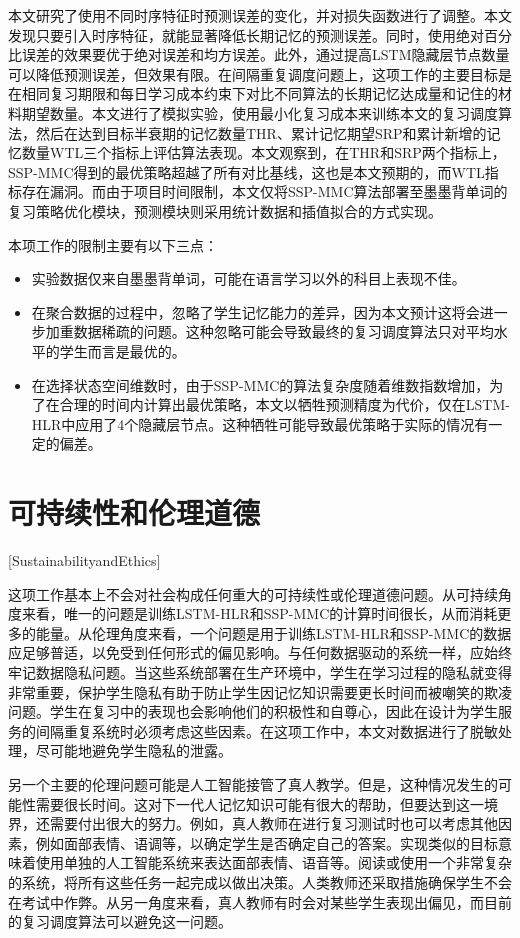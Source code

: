 本文研究了使用不同时序特征时预测误差的变化，并对损失函数进行了调整。本文发现只要引入时序特征，就能显著降低长期记忆的预测误差。同时，使用绝对百分比误差的效果要优于绝对误差和均方误差。此外，通过提高LSTM隐藏层节点数量可以降低预测误差，但效果有限。在间隔重复调度问题上，这项工作的主要目标是在相同复习期限和每日学习成本约束下对比不同算法的长期记忆达成量和记住的材料期望数量。本文进行了模拟实验，使用最小化复习成本来训练本文的复习调度算法，然后在达到目标半衰期的记忆数量THR、累计记忆期望SRP和累计新增的记忆数量WTL三个指标上评估算法表现。本文观察到，在THR和SRP两个指标上，SSP-MMC得到的最优策略超越了所有对比基线，这也是本文预期的，而WTL指标存在漏洞。而由于项目时间限制，本文仅将SSP-MMC算法部署至墨墨背单词的复习策略优化模块，预测模块则采用统计数据和插值拟合的方式实现。

本项工作的限制主要有以下三点：

\begin{itemize}
    \item 实验数据仅来自墨墨背单词，可能在语言学习以外的科目上表现不佳。
    \item 在聚合数据的过程中，忽略了学生记忆能力的差异，因为本文预计这将会进一步加重数据稀疏的问题。这种忽略可能会导致最终的复习调度算法只对平均水平的学生而言是最优的。
    \item 在选择状态空间维数时，由于SSP-MMC的算法复杂度随着维数指数增加，为了在合理的时间内计算出最优策略，本文以牺牲预测精度为代价，仅在LSTM-HLR中应用了4个隐藏层节点。这种牺牲可能导致最优策略于实际的情况有一定的偏差。
\end{itemize}

\section{可持续性和伦理道德}[SustainabilityandEthics]

这项工作基本上不会对社会构成任何重大的可持续性或伦理道德问题。从可持续角度来看，唯一的问题是训练LSTM-HLR和SSP-MMC的计算时间很长，从而消耗更多的能量。从伦理角度来看，一个问题是用于训练LSTM-HLR和SSP-MMC的数据应足够普适，以免受到任何形式的偏见影响。与任何数据驱动的系统一样，应始终牢记数据隐私问题。当这些系统部署在生产环境中，学生在学习过程的隐私就变得非常重要，保护学生隐私有助于防止学生因记忆知识需要更长时间而被嘲笑的欺凌问题。学生在复习中的表现也会影响他们的积极性和自尊心，因此在设计为学生服务的间隔重复系统时必须考虑这些因素。在这项工作中，本文对数据进行了脱敏处理，尽可能地避免学生隐私的泄露。

另一个主要的伦理问题可能是人工智能接管了真人教学。但是，这种情况发生的可能性需要很长时间。这对下一代人记忆知识可能有很大的帮助，但要达到这一境界，还需要付出很大的努力。例如，真人教师在进行复习测试时也可以考虑其他因素，例如面部表情、语调等，以确定学生是否确定自己的答案。实现类似的目标意味着使用单独的人工智能系统来表达面部表情、语音等。阅读或使用一个非常复杂的系统，将所有这些任务一起完成以做出决策。人类教师还采取措施确保学生不会在考试中作弊。从另一角度来看，真人教师有时会对某些学生表现出偏见，而目前的复习调度算法可以避免这一问题。

